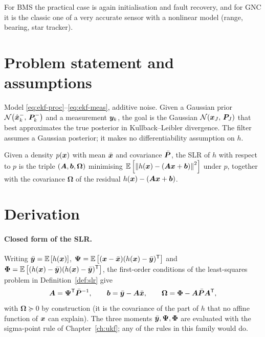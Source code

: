 For BMS the practical case is again initialisation and fault recovery, and for GNC it is the
classic one of a very accurate sensor with a nonlinear model (range, bearing, star tracker).

\section{Problem statement and assumptions}
Model \eqref{eq:ekf-proc}--\eqref{eq:ekf-meas}, additive noise. Given a Gaussian prior
$\mathcal{N}\!\left(\hat{\bm{x}}^{-}_k,\,\bm{P}^{-}_k\right)$ and a measurement $\bm{y}_k$, the goal is the Gaussian
$\mathcal{N}\!\left(\bm{x}_J,\,\bm{P}_J\right)$ that best approximates the true posterior in Kullback--Leibler divergence.
The filter assumes a Gaussian posterior; it makes no differentiability assumption on $h$.

\begin{definition}\label{def:slr}
Given a density $p(\bm{x})$ with mean $\bar{\bm{x}}$ and covariance $\bar{\bm{P}}$, the SLR of $h$ with
respect to $p$ is the triple $(\bm{A},\bm{b},\bm{\Omega})$ minimising
$\mathbb{E}\left[\left\lVert h(\bm{x})-(\bm{A}\bm{x}+\bm{b}) \right\rVert^2\right]$ under $p$, together with the covariance
$\bm{\Omega}$ of the residual $h(\bm{x})-(\bm{A}\bm{x}+\bm b)$.
\end{definition}

\section{Derivation}
\paragraph{Closed form of the SLR.} Writing
$\bar{\bm{y}} = \mathbb{E}\left[h(\bm{x})\right]$, $\bm{\Psi} = \mathbb{E}\left[(\bm{x}-\bar{\bm{x}})(h(\bm{x})-\bar{\bm{y}})^{\mathsf{T}}\right]$ and
$\bm{\Phi} = \mathbb{E}\left[(h(\bm{x})-\bar{\bm{y}})(h(\bm{x})-\bar{\bm{y}})^{\mathsf{T}}\right]$, the first-order conditions of the
least-squares problem in Definition~\ref{def:slr} give
\begin{equation}
\bm{A} = \bm{\Psi}^{\mathsf{T}}\bar{\bm{P}}^{-1}, \qquad
\bm{b} = \bar{\bm{y}} - \bm{A}\bar{\bm{x}}, \qquad
\bm{\Omega} = \bm{\Phi} - \bm{A}\bar{\bm{P}}\bm{A}^{\mathsf{T}},
\label{eq:iplf-slr}
\end{equation}
with $\bm{\Omega}\succeq 0$ by construction (it is the covariance of the part of $h$ that no
affine function of $\bm{x}$ can explain). The three moments $\bar{\bm{y}},\bm\Psi,\bm\Phi$ are
evaluated with the sigma-point rule of Chapter~\ref{ch:ukf}; any of the rules in this family
would do.


